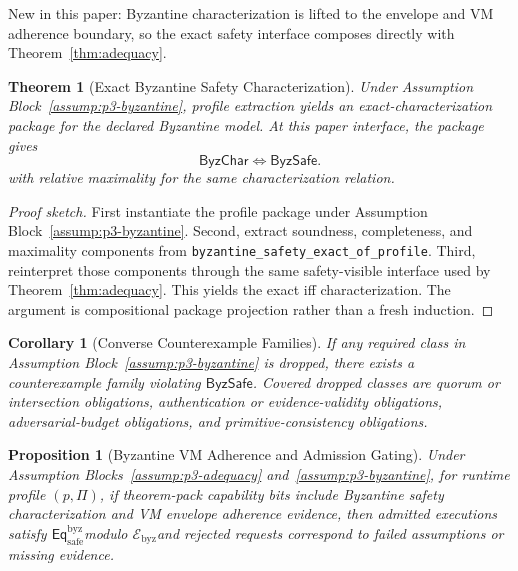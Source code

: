 \documentclass[a4paper,10pt,twocolumn,english]{article}
\numberwithin{equation}{section}
\theoremstyle{paperdef}
\theoremstyle{paperplain}
\newtheorem{theorem}[definition]{Theorem}
\newtheorem{proposition}[definition]{Proposition}
\newtheorem{corollary}[definition]{Corollary}
\theoremstyle{paperdef}
\theoremstyle{paperremark}
\theoremstyle{paperdef}
\newcommand{\Eqsafe}{\ensuremath{\mathsf{Eq}_{\mathrm{safe}}^{\mathrm{byz}}}}
\newcommand{\Ebyz}{\ensuremath{\mathcal{E}_{\mathrm{byz}}}}
\newcommand{\ByzSafe}{\ensuremath{\mathsf{ByzSafe}}}
\newcommand{\ByzChar}{\ensuremath{\mathsf{ByzChar}}}
\begin{document}
New in this paper: Byzantine characterization is lifted to the envelope and VM
adherence boundary, so the exact safety interface composes directly with
Theorem~\ref{thm:adequacy}.

\begin{theorem}[Exact Byzantine Safety Characterization]
	\label{thm:byzantine}
	Under Assumption Block~\ref{assump:p3-byzantine}, profile extraction yields an exact-characterization package for the declared Byzantine model. At this paper interface, the package gives
	\begin{equation}
		\ByzChar \iff \ByzSafe.
	\end{equation}
	with relative maximality for the same characterization relation.
\end{theorem}

\begin{proof}[Proof sketch]
	First instantiate the profile package under
	Assumption Block~\ref{assump:p3-byzantine}. Second, extract soundness,
	completeness, and maximality components from
	\nolinkurl{byzantine_safety_exact_of_profile}. Third, reinterpret those
	components through the same safety-visible interface used by
	Theorem~\ref{thm:adequacy}. This yields the exact iff characterization.
	The argument is compositional package projection rather than a fresh induction.
\end{proof}

\begin{corollary}[Converse Counterexample Families]
	\label{cor:byzantine-converse}
	If any required class in Assumption Block~\ref{assump:p3-byzantine} is dropped, there exists a counterexample family violating \ByzSafe. Covered dropped classes are quorum or intersection obligations, authentication or evidence-validity obligations, adversarial-budget obligations, and primitive-consistency obligations.
\end{corollary}

\begin{proposition}[Byzantine VM Adherence and Admission Gating]
	\label{prop:byzantine-vm}
	Under Assumption Blocks~\ref{assump:p3-adequacy} and~\ref{assump:p3-byzantine}, for runtime profile $(p,\Pi)$, if theorem-pack capability bits include Byzantine safety characterization and VM envelope adherence evidence, then admitted executions satisfy \Eqsafe modulo \Ebyz and rejected requests correspond to failed assumptions or missing evidence.
\end{proposition}

\end{document}
